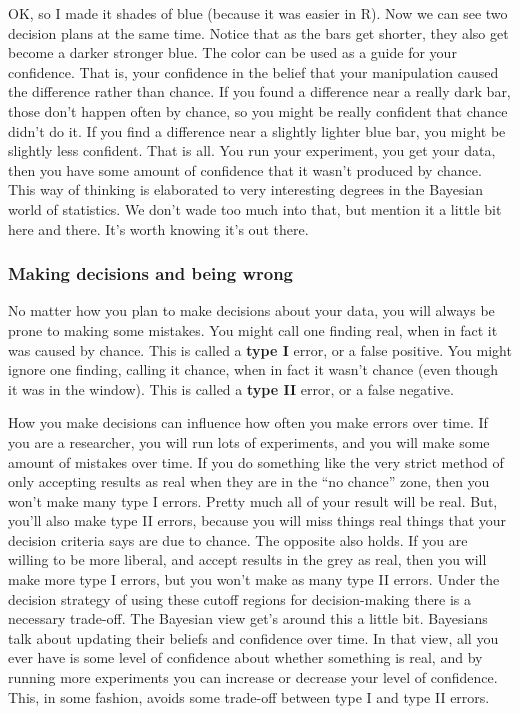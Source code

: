 \documentclass[
  letterpaper,
  DIV=11,
  numbers=noendperiod]{scrreprt}
\begin{document}
OK, so I made it shades of blue (because it was easier in R). Now we can
see two decision plans at the same time. Notice that as the bars get
shorter, they also get become a darker stronger blue. The color can be
used as a guide for your confidence. That is, your confidence in the
belief that your manipulation caused the difference rather than chance.
If you found a difference near a really dark bar, those don't happen
often by chance, so you might be really confident that chance didn't do
it. If you find a difference near a slightly lighter blue bar, you might
be slightly less confident. That is all. You run your experiment, you
get your data, then you have some amount of confidence that it wasn't
produced by chance. This way of thinking is elaborated to very
interesting degrees in the Bayesian world of statistics. We don't wade
too much into that, but mention it a little bit here and there. It's
worth knowing it's out there.

\subsubsection{Making decisions and being
wrong}\label{making-decisions-and-being-wrong}

No matter how you plan to make decisions about your data, you will
always be prone to making some mistakes. You might call one finding
real, when in fact it was caused by chance. This is called a
\textbf{type I} error, or a false positive. You might ignore one
finding, calling it chance, when in fact it wasn't chance (even though
it was in the window). This is called a \textbf{type II} error, or a
false negative.

How you make decisions can influence how often you make errors over
time. If you are a researcher, you will run lots of experiments, and you
will make some amount of mistakes over time. If you do something like
the very strict method of only accepting results as real when they are
in the ``no chance'' zone, then you won't make many type I errors.
Pretty much all of your result will be real. But, you'll also make type
II errors, because you will miss things real things that your decision
criteria says are due to chance. The opposite also holds. If you are
willing to be more liberal, and accept results in the grey as real, then
you will make more type I errors, but you won't make as many type II
errors. Under the decision strategy of using these cutoff regions for
decision-making there is a necessary trade-off. The Bayesian view get's
around this a little bit. Bayesians talk about updating their beliefs
and confidence over time. In that view, all you ever have is some level
of confidence about whether something is real, and by running more
experiments you can increase or decrease your level of confidence. This,
in some fashion, avoids some trade-off between type I and type II
errors.
\end{document}
